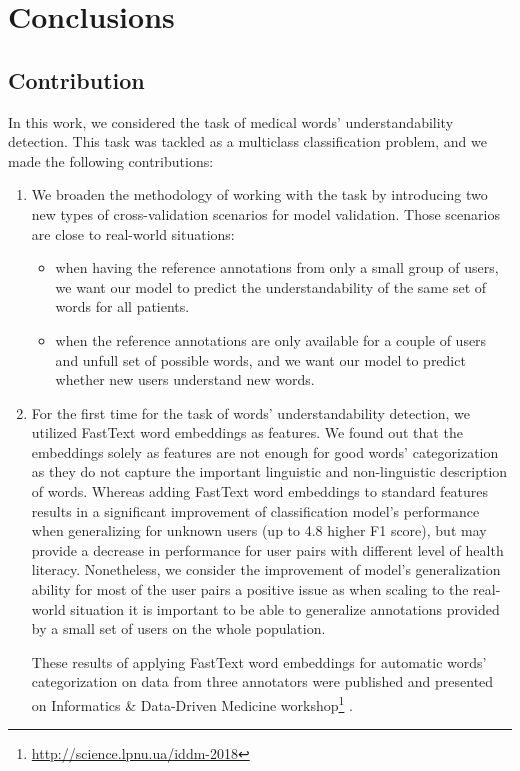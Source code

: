 \chapter{Conclusions}
\label{ch:conclusions}

\section{Contribution}
In this work, we considered the task of medical words' understandability detection. This task was tackled as a multiclass classification problem, and we made the following contributions:

\begin{enumerate}[listparindent=1.5em]
    \item We broaden the methodology of working with the task by introducing two new types of cross-validation scenarios for model validation. Those scenarios are close to real-world situations:
    \begin{itemize}
        \item when having the reference annotations from only a small group of users, we want our model to predict the understandability of the same set of words for all patients. 
        \item when the reference annotations are only available for a couple of users and unfull set of possible words, and we want our model to predict whether new users understand new words.
    \end{itemize}
    
    \item For the first time for the task of words' understandability detection, we utilized FastText word embeddings as features. We found out that the embeddings solely as features are not enough for good words' categorization as they do not capture the important linguistic and non-linguistic description of words. Whereas adding FastText word embeddings to standard features results in a significant improvement of classification model's performance when generalizing for unknown users (up to 4.8 higher F1 score), but may provide a decrease in performance for user pairs with different level of health literacy. Nonetheless, we consider the improvement of model's generalization ability for most of the user pairs a positive issue as when scaling to the real-world situation it is important to be able to generalize annotations provided by a small set of users on the whole population.
    
    These results of applying FastText word embeddings for automatic words' categorization on data from three annotators were published and presented on Informatics & Data-Driven Medicine workshop\footnote{\url{http://science.lpnu.ua/iddm-2018}} \citep{Pylieva:2018}.
    

\end{enumerate}
